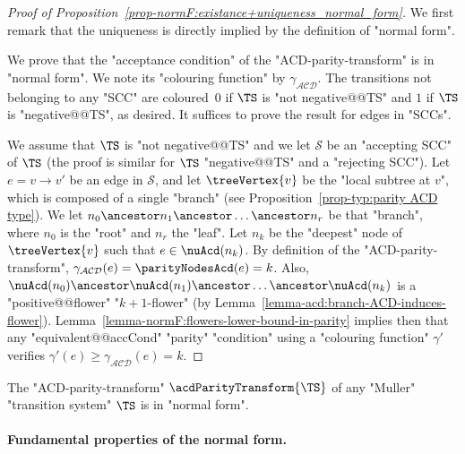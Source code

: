 \documentclass[10pt,a4paper]{amsart}
\renewcommand{\S}{\mathcal{S}}
\renewcommand{\gg}{\gamma}
\newcommand{\re}[1]{\xrightarrow{#1}}
\newcommand\acdNoP{\mathcal{ACD}}
\begin{document}
\begin{proof}[Proof of Proposition~\ref{prop-normF:existance+uniqueness_normal_form}]
	We first remark that the uniqueness is directly implied by the definition of "normal form".
	
	We prove that the "acceptance condition" of the "ACD-parity-transform"  is in "normal form". We note its "colouring function" by $\gg_{\acdNoP}$.
	The transitions not belonging to any "SCC" are coloured~$0$ if $\TS$ is "not negative@@TS" and $1$ if $\TS$ is "negative@@TS", as desired. It suffices to prove the result for edges in "SCCs".
	
	We assume that $\TS$ is "not negative@@TS" and 
	we let $\S$ be an "accepting SCC" of $\TS$ (the proof is similar for $\TS$ "negative@@TS" and a "rejecting SCC"). %
	Let $e=v\re{}v'$ be an edge in $\S$, and let $\treeVertex{v}$ be the "local subtree at $v$", which is composed of a single "branch" (see Proposition~\ref{prop-typ:parity ACD type}). We let $n_0\ancestor n_1 \ancestor\dots \ancestor n_r$ be that "branch", where $n_0$ is the "root" and $n_r$ the "leaf". Let $n_k$ be the "deepest" node of $\treeVertex{v}$ such that $e\in \nuAcd(n_k)$. By definition of the "ACD-parity-transform", $\gg_{\acdNoP}(e) = \parityNodesAcd(e) = k$. Also, $\nuAcd(n_0)\ancestor \nuAcd(n_1) \ancestor\dots \ancestor \nuAcd(n_k)$ is a "positive@@flower" "$k+1$-flower" (by Lemma~\ref{lemma-acd:branch-ACD-induces-flower}).
	Lemma~\ref{lemma-normF:flowers-lower-bound-in-parity} implies then that any "equivalent@@accCond" "parity" "condition" using a "colouring function" $\gg'$ verifies $\gg'(e)\geq \gg_{\acdNoP}(e)=k$. 
\end{proof}


\begin{corollary}\label{cor-normF:ACD-transform_normal_form}
	The "ACD-parity-transform" $\acdParityTransform{\TS}$ of any "Muller" "transition system" $\TS$ is in "normal form". %
\end{corollary}



\paragraph*{Fundamental properties of the normal form.}
\end{document}
